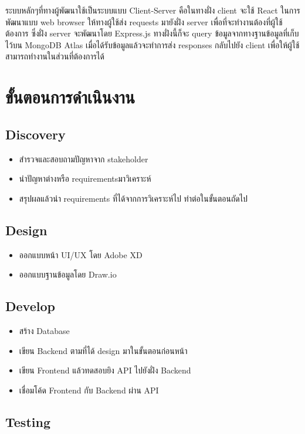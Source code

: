 ระบบหลักๆที่ทางผู้พัฒนาใช้เป็นระบบแบบ Client-Server คือในทางฝั่ง client จะใช้ React ในการพัฒนาแบบ web browser ให้ทางผู้ใช้ส่ง requests มายังฝั่ง server เพื่อที่จะทำงานต้องที่ผู้ใช้ต้องการ ซึ่งฝั่ง server 
จะพัฒนาโดย Express.js ทางฝั่งนี้ก็จะ query ข้อมูลจากทางฐานข้อมูลที่เก็บไว้บน MongoDB Atlas เมื่อได้รับข้อมูลแล้วจะทำการส่ง responses กลับไปยัง client เพื่อให้ผู้ใช้สามารถทำงานในส่วนที่ต้องการได้

\section{ขั้นตอนการดำเนินงาน}
\subsection{Discovery}
\begin{itemize}
  \item สำรวจและสอบถามปัญหาจาก stakeholder
  \item นำปัญหาต่างหรือ requirementsมาวิเคราะห์
  \item สรุปผลแล้วนำ requirements ที่ได้จากการวิเคราะห์ไป  ทำต่อในขั้นตอนถัดไป
\end{itemize}

\subsection{Design}
\begin{itemize}
  \item ออกแบบหน้า UI/UX โดย Adobe XD
  \item ออกแบบฐานข้อมูลโดย Draw.io
\end{itemize}

\subsection{Develop}
\begin{itemize}
  \item สร้าง Database
  \item เขียน Backend ตามที่ได้ design มาในขั้นตอนก่อนหน้า
  \item เขียน Frontend แล้วทดสอบยิง API ไปยังฝั่ง Backend
  \item เชื่อมโค้ด Frontend กับ Backend ผ่าน API
\end{itemize}

\subsection{Testing}
